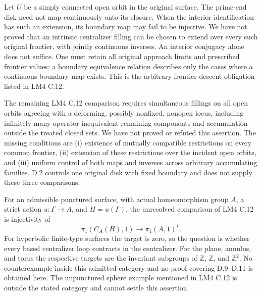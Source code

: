 Let $U$ be a simply connected open orbit in the original surface.
The prime-end disk need not map continuously onto its closure.
When the interior identification has such an extension,
its boundary map may fail to be injective.
We have not proved that an intrinsic centralizer filling can
be chosen to extend over every such original frontier, with
jointly continuous inverses.  An interior conjugacy alone does
not suffice.  One must retain all original approach limits and
prescribed frontier values; a boundary equivalence relation
describes only the cases where a continuous boundary map exists.
This is the
arbitrary-frontier descent obligation listed in LM4 C.12.

The remaining LM4 C.12 comparison requires simultaneous fillings
on all open orbits agreeing with a deforming, possibly nonfixed,
nonopen locus, including infinitely many operator-inequivalent
remaining components and accumulation outside the treated closed
sets.  We have not proved or refuted this assertion.  The missing
conditions are (i) existence of mutually compatible restrictions
on every common frontier, (ii) extension of these restrictions over
the incident open orbits, and (iii) uniform control of both maps
and inverses across arbitrary accumulating families.  D.2 controls
one original disk with fixed boundary and does not supply these
three comparisons.

For an admissible punctured surface, with actual homeomorphism
group $A$, a strict action $u:\Gamma\to A$, and $H=u(\Gamma)$,
the unresolved comparison of LM4 C.12 is injectivity of
\[
 \pi_1(C_A(H),1)\longrightarrow\pi_1(A,1)^\Gamma.
\]
For hyperbolic finite-type surfaces the target is zero, so the
question is whether every based centralizer loop contracts in
the centralizer.  For the plane, annulus, and torus the respective
targets are the invariant subgroups of $\mathbb Z$, $\mathbb Z$,
and $\mathbb Z^2$.  No counterexample inside this admitted
category and no proof covering D.9--D.11 is obtained here.  The
unpunctured sphere example mentioned in LM4 C.12 is outside the
stated category and cannot settle this assertion.

